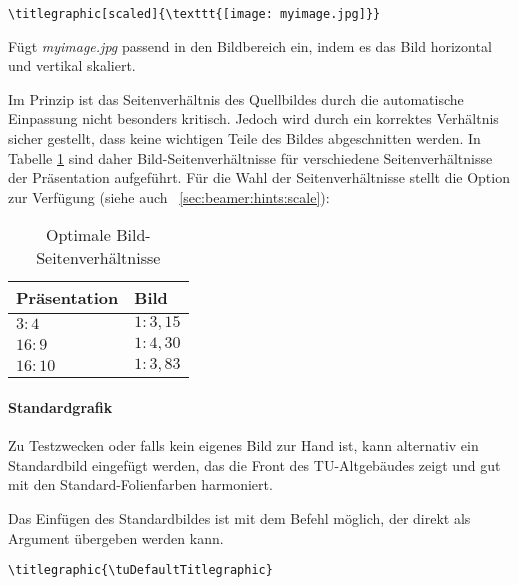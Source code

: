 \begin{example}
  \begin{lstlisting}
\titlegraphic[scaled]{\texttt{[image: myimage.jpg]}}
  \end{lstlisting}
  Fügt \textit{myimage.jpg} passend in den Bildbereich ein, indem es das Bild
  horizontal und vertikal skaliert.
\end{example}

Im Prinzip ist das Seitenverhältnis des Quellbildes durch die automatische
Einpassung nicht besonders kritisch. Jedoch wird durch ein korrektes Verhältnis
sicher gestellt, dass keine wichtigen Teile des Bildes abgeschnitten werden.
In Tabelle \ref{tbl:picratio} sind daher Bild-Seiten\-verhältnisse für
verschiedene Seitenverhältnisse der Präsentation aufgeführt.
Für die Wahl der Seitenverhältnisse stellt  die Option
 zur Verfügung (siehe auch \chaptername~\ref{sec:beamer:hints:scale}):

\begin{table}[ht]
\centering
\begin{tabular}{ll}
\bfseries Präsentation  & \bfseries  Bild  \\
\midrule
$3:4$   & $1:3{,}15$ \\
$16:9$  & $1:4{,}30$ \\
$16:10$ & $1:3{,}83$ \\
\end{tabular}
\caption{Optimale Bild-Seitenverhältnisse}
\label{tbl:picratio}
\end{table}



\paragraph{Standardgrafik}

Zu Testzwecken oder falls kein eigenes Bild zur Hand ist,
kann alternativ ein Standardbild eingefügt werden, das die Front
des TU-Altgebäudes zeigt und gut mit den Standard-Folienfarben harmoniert.

Das Einfügen des Standardbildes ist mit dem Befehl
\linebreak{} möglich,
der  direkt als Argument übergeben werden kann.

\begin{example}
\begin{lstlisting}
\titlegraphic{\tuDefaultTitlegraphic}
\end{lstlisting}
\end{example}


